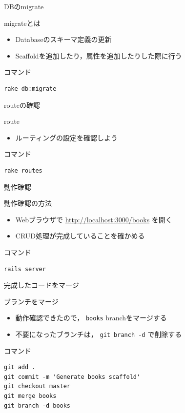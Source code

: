 \documentclass[t, aspectratio=169]{beamer}
\begin{document}
\begin{frame}[fragile,label=sec-7-1-3]{DBのmigrate}
 \begin{block}{migrateとは}
\begin{itemize}
\item Databaseのスキーマ定義の更新
\item Scaffoldを追加したり，属性を追加したりした際に行う
\end{itemize}
\end{block}
\begin{block}{コマンド}
\begin{verbatim}
rake db:migrate
\end{verbatim}
\end{block}
\end{frame}

\begin{frame}[fragile,label=sec-7-1-4]{routeの確認}
 \begin{block}{route}
\begin{itemize}
\item ルーティングの設定を確認しよう
\end{itemize}
\end{block}
\begin{block}{コマンド}
\begin{verbatim}
rake routes
\end{verbatim}
\end{block}
\end{frame}

\begin{frame}[fragile,label=sec-7-1-5]{動作確認}
 \begin{block}{動作確認の方法}
\begin{itemize}
\item Webブラウザで \url{http://localhost:3000/books} を開く
\item CRUD処理が完成していることを確かめる
\end{itemize}
\end{block}
\begin{block}{コマンド}
\begin{verbatim}
rails server
\end{verbatim}
\end{block}
\end{frame}

\begin{frame}[fragile,label=sec-7-1-6]{完成したコードをマージ}
 \begin{block}{ブランチをマージ}
\begin{itemize}
\item 動作確認できたので， \texttt{books} branchをマージする
\item 不要になったブランチは， \texttt{git branch -d} で削除する
\end{itemize}
\end{block}
\begin{block}{コマンド}
\begin{verbatim}
git add .
git commit -m 'Generate books scaffold'
git checkout master
git merge books
git branch -d books
\end{verbatim}
\end{block}
\end{frame}
\end{document}
